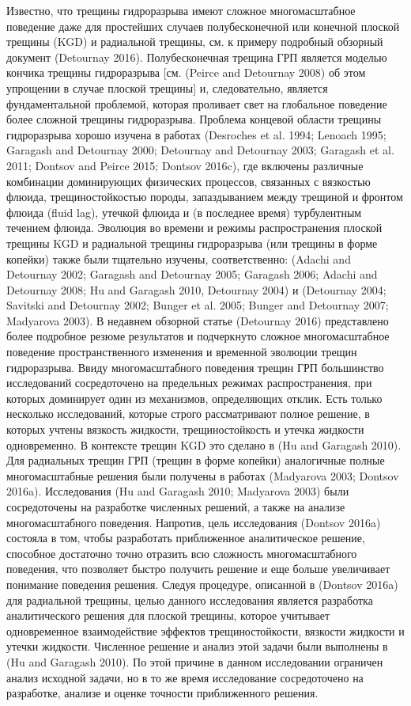 \documentclass[main.tex]{subfiles}
\begin{document}
Известно, что трещины гидроразрыва имеют сложное многомасштабное поведение даже для простейших случаев полубесконечной или конечной плоской трещины (KGD) и радиальной трещины, см. к примеру подробный обзорный документ (Detournay 2016).
Полубесконечная трещина ГРП является моделью кончика трещины гидроразрыва [см. (Peirce and Detournay 2008) об этом упрощении в случае плоской трещины] и, следовательно, является фундаментальной проблемой, которая проливает свет на глобальное поведение более сложной трещины гидроразрыва.
Проблема концевой области трещины гидроразрыва хорошо изучена в работах (Desroches et al. 1994; Lenoach 1995; Garagash and Detournay 2000; Detournay and Detournay 2003; Garagash et al. 2011; Dontsov and Peirce 2015; Dontsov 2016c), где включены различные комбинации доминирующих физических процессов, связанных с вязкостью флюида, трещиностойкостью породы, запаздыванием между трещиной и фронтом флюида (fluid lag), утечкой флюида и (в последнее время) турбулентным течением флюида.
Эволюция во времени и режимы распространения плоской трещины KGD и радиальной трещины гидроразрыва (или трещины в форме копейки) также были тщательно изучены, соответственно: (Adachi and Detournay 2002; Garagash and Detournay 2005; Garagash 2006; Adachi and Detournay 2008; Hu and Garagash 2010, Detournay 2004) и (Detournay 2004; Savitski and Detournay 2002; Bunger et al. 2005; Bunger and Detournay 2007; Madyarova 2003).
В недавнем обзорной статье (Detournay 2016) представлено более подробное резюме результатов и подчеркнуто сложное многомасштабное поведение пространственного изменения и временной эволюции трещин гидроразрыва.
Ввиду многомасштабного поведения трещин ГРП большинство исследований сосредоточено на предельных режимах распространения, при которых доминирует один из механизмов, определяющих отклик.
Есть только несколько исследований, которые строго рассматривают полное решение, в которых учтены вязкость жидкости, трещиностойкость и утечка жидкости одновременно.
В контексте трещин KGD это сделано в (Hu and Garagash 2010).
Для радиальных трещин ГРП (трещин в форме копейки) аналогичные полные многомасштабные решения были получены в работах (Madyarova 2003; Dontsov 2016a).
Исследования (Hu and Garagash 2010; Madyarova 2003) были сосредоточены на разработке численных решений, а также на анализе многомасштабного поведения.
Напротив, цель исследования (Dontsov 2016a) состояла в том, чтобы разработать приближенное аналитическое решение, способное достаточно точно отразить всю сложность многомасштабного поведения, что позволяет быстро получить решение и еще больше увеличивает понимание поведения решения.
Следуя процедуре, описанной в (Dontsov 2016a) для радиальной трещины, целью данного исследования является разработка аналитического решения для плоской трещины, которое учитывает одновременное взаимодействие эффектов трещиностойкости, вязкости жидкости и утечки жидкости.
Численное решение и анализ этой задачи были выполнены в (Hu and Garagash 2010).
По этой причине в данном исследовании ограничен анализ исходной задачи, но в то же время исследование сосредоточено на разработке, анализе и оценке точности приближенного решения.
\end{document}
